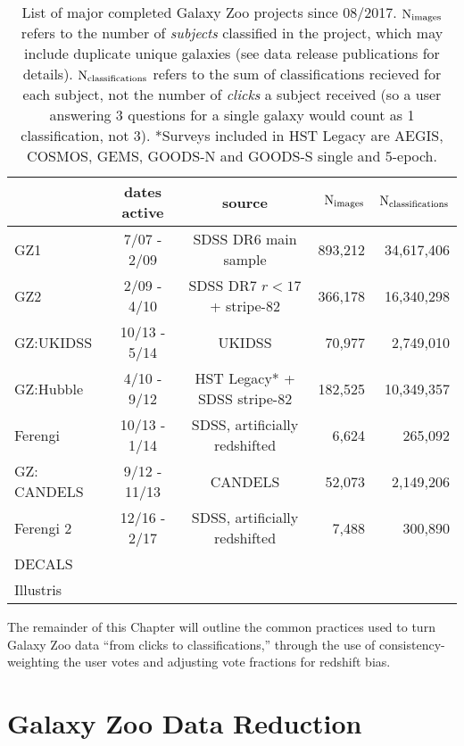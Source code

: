 \begin{table}
\rotate
\caption{List of major completed Galaxy Zoo projects since 08/2017. $\rm N_{images}$ refers to the number of \emph{subjects} classified in the project, which may include duplicate unique galaxies (see data release publications for details). $\rm N_{classifications}$ refers to the sum of classifications recieved for each subject, not the number of \emph{clicks} a subject received (so a user answering 3 questions for a single galaxy would count as 1 classification, not 3). *Surveys included in HST Legacy are AEGIS, COSMOS, GEMS, GOODS-N and GOODS-S single and 5-epoch. }\label{tab:project_summary}
\begin{tabular}{lccrr}
\hline\hline
                    & dates active &  source 			   & $\rm N_{images}$ & $\rm N_{classifications}$   \\
\hline
GZ1        	    & 7/07 - 2/09  & SDSS DR6 main sample          & 893,212 	      & 34,617,406 \\
GZ2      	    & 2/09 - 4/10  & SDSS DR7 $r < 17$ + stripe-82 & 366,178          & 16,340,298 \\
GZ:UKIDSS           & 10/13 - 5/14 & UKIDSS   			   & 70,977           & 2,749,010 \\ 
GZ:Hubble           & 4/10 - 9/12  & HST Legacy* + SDSS stripe-82  & 182,525          & 10,349,357 \\
Ferengi             & 10/13 - 1/14 & SDSS, artificially redshifted & 6,624            & 265,092 \\
GZ: CANDELS         & 9/12 - 11/13 & CANDELS   			   & 52,073           & 2,149,206 \\
Ferengi 2           & 12/16 - 2/17 & SDSS, artificially redshifted & 7,488            & 300,890 \\
DECALS              &              &				   &		      &         \\
Illustris           &              & 				   &		      &         \\

\hline
\hline
\end{tabular}
\end{table}


The remainder of this Chapter will outline the common practices used to turn Galaxy Zoo data ``from clicks to classifications,'' through the use of consistency-weighting the user votes and adjusting vote fractions for redshift bias. 

\section{Galaxy Zoo Data Reduction}
